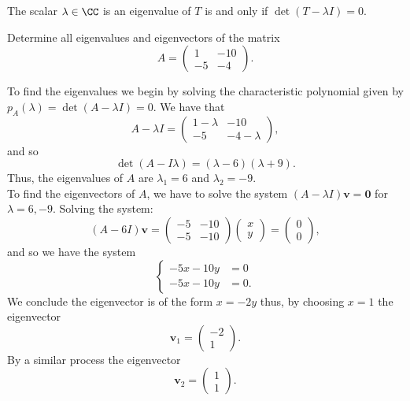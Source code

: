 \documentclass[12pt, a4paper]{article}
\begin{document}
\begin{mdthm}
    The scalar \(\lambda \in \CC\) is an eigenvalue of \(T\) is and only if \(\det(T-\lambda I)=0\).
\end{mdthm}

\begin{example}
    Determine all eigenvalues and eigenvectors of the matrix 
    \[A = \begin{pmatrix} 1 & -10 \\ -5 & -4 \end{pmatrix}.\]
    \begin{solution}
        To find the eigenvalues we begin by solving the characteristic polynomial given by \(p_A(\lambda)=\det(A-\lambda I)=0\). We have that 
        \[A-\lambda I = \begin{pmatrix} 1-\lambda & -10 \\ -5 & -4-\lambda \end{pmatrix},\]
        and so 
        \[\det(A-I\lambda)=(\lambda-6)(\lambda+9).\]
        Thus, the eigenvalues of \(A\) are \(\lambda_1 = 6\) and \(\lambda_2 = -9\). \\
        To find the eigenvectors of \(A\), we have to solve the system \((A-\lambda I)\bm{v} = \bm{0}\) for \(\lambda=6,-9\). Solving the system: 
        \[(A-6I)\bm{v} = \begin{pmatrix} -5 & -10 \\ -5 & -10 \end{pmatrix} \begin{pmatrix} x \\ y \end{pmatrix} = \begin{pmatrix} 0 \\0 \end{pmatrix},\]
        and so we have the system 
        \[\begin{cases}
            -5x-10y&=0 \\
            -5x-10y&=0.
        \end{cases}\]
        We conclude the eigenvector is of the form \(x=-2y\) thus, by choosing \(x=1\) the eigenvector 
        \[\bm{v}_1 = \begin{pmatrix} -2 \\ 1 \end{pmatrix}.\]
        By a similar process the eigenvector 
        \[\bm{v}_2 = \begin{pmatrix} 1 \\1 \end{pmatrix}.\]
    \end{solution}
\end{example}
\end{document}
